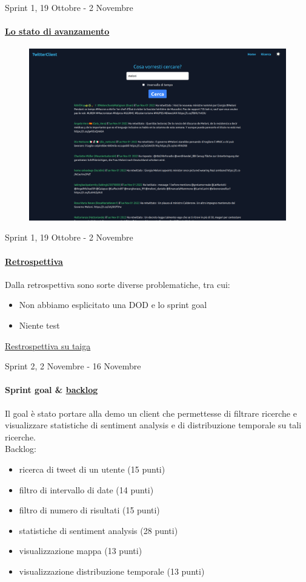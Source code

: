 \documentclass[12pt, aspectration=169]{beamer}
\begin{document}
\begin{frame}{Sprint 1, 19 Ottobre - 2 Novembre}
\framesubtitle{\href{https://taiga.hjkl.gq/project/ingsw2022-team3/wiki/sprint-rw-3110}{Lo stato di avanzamento}}
\begin{figure}[H]
    \centering
    \includegraphics[scale=0.15]{reviews/sprint_review1031.png}
    \label{fig:review1}
\end{figure}
\end{frame}
\begin{frame}{Sprint 1, 19 Ottobre - 2 Novembre}
\framesubtitle{\href{https://taiga.hjkl.gq/project/ingsw2022-team3/wiki/retrospettiva-sprint-1}{Retrospettiva}}
Dalla retrospettiva sono sorte diverse problematiche, tra cui:
\begin{itemize}
    \item Non abbiamo esplicitato una DOD e lo sprint goal
    \item Niente test
\end{itemize}
\href{https://taiga.hjkl.gq/project/ingsw2022-team3/wiki/retrospettiva-sprint-1}{Restrospettiva su taiga}
\end{frame}
\begin{frame}{Sprint 2, 2 Novembre - 16 Novembre}
\framesubtitle{Sprint goal \& \href{https://taiga.hjkl.gq/project/ingsw2022-team3/taskboard/sprint-2-5}{backlog}}
Il goal \`e stato portare alla demo un client che permettesse di filtrare ricerche e visualizzare statistiche di sentiment analysis e di distribuzione temporale su tali ricerche. \\
Backlog:
\begin{itemize}
    \item ricerca di tweet di un utente (15 punti)
    \item filtro di intervallo di date (14 punti)
    \item filtro di numero di risultati (15 punti)
    \item statistiche di sentiment analysis (28 punti)
    \item visualizzazione mappa (13 punti)
    \item visualizzazione distribuzione temporale (13 punti)
\end{itemize}
\end{frame}
\end{document}
